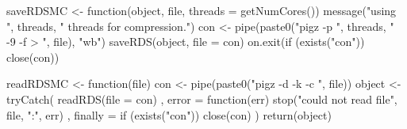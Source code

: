 

\begin{rcode}

saveRDSMC <- function(object, file, threads = getNumCores()) {
  message("using ", threads, " threads for compression.")
  con <- pipe(paste0("pigz -p ", threads, " -9 -f > ", file), "wb")
  saveRDS(object, file = con)
  on.exit(if (exists("con")) close(con))
}

readRDSMC <- function(file) {
  con <- pipe(paste0("pigz -d -k -c ", file))
  object <- tryCatch({
    readRDS(file = con)
  }, error = function(err) {
    stop("could not read file\n", file, ":\n", err)
  }, finally = {
    if (exists("con")) close(con)
  })
  return(object)
}

\end{rcode}

